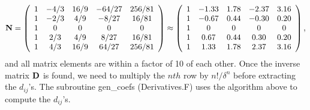 \documentclass[12pt,letterpaper]{article}
\begin{document}
\begin{equation}
{\bf N} = 
\left( \begin{array}{ccccc} 
		1 & -4/3 & 16/9 & -64/27 & 256/81 \\
		1 & -2/3 & 4/9 & -8/27 & 16/81 \\
		1 & 0 & 0 & 0 & 0 \\
		1 & 2/3 & 4/9 & 8/27 & 16/81 \\
		1 & 4/3 & 16/9 & 64/27 & 256/81 \\
\end{array} \right)
\approx
\left( \begin{array}{ccccc} 
		1 & -1.33 & 1.78 & -2.37 & 3.16 \\
		1 & -0.67 & 0.44 & -0.30 & 0.20 \\
		1 & 0 & 0 & 0 & 0 \\
		1 & 0.67 & 0.44 & 0.30 & 0.20 \\
		1 & 1.33 & 1.78 & 2.37 & 3.16 \\
\end{array} \right),
\end{equation}
and all matrix elements are within a factor of 10 of each other.  Once the inverse matrix $\bf D$ is found, we need to multiply the $nth$ row by $n!/\delta^n$ before extracting the $d_{ij}$'s.  The subroutine gen\_coefs (Derivatives.F) uses the algorithm above to compute the $d_{ij}$'s.
\end{document}
